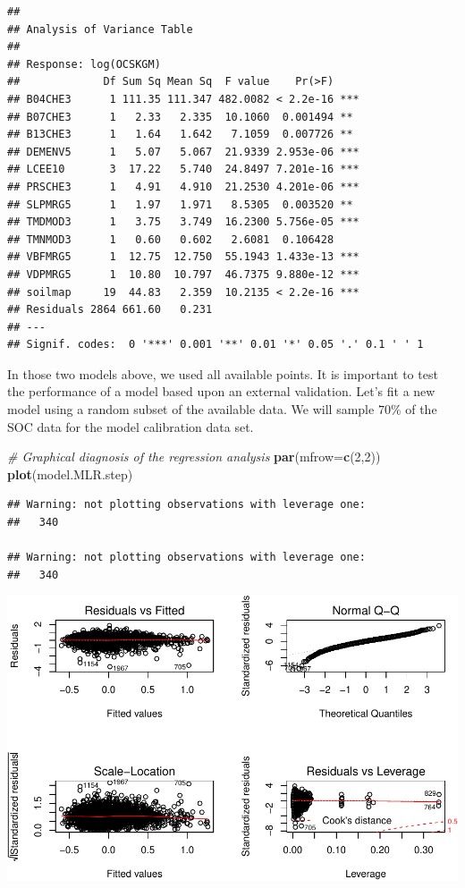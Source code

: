 \documentclass[10pt,b5paper,]{book}
\newenvironment{Shaded}{\begin{snugshade}}{\end{snugshade}}
\newcommand{\CommentTok}[1]{\textcolor[rgb]{0.56,0.35,0.01}{\textit{#1}}}
\newcommand{\DataTypeTok}[1]{\textcolor[rgb]{0.13,0.29,0.53}{#1}}
\newcommand{\DecValTok}[1]{\textcolor[rgb]{0.00,0.00,0.81}{#1}}
\newcommand{\KeywordTok}[1]{\textcolor[rgb]{0.13,0.29,0.53}{\textbf{#1}}}
\newcommand{\NormalTok}[1]{#1}
\theoremstyle{definition}
\theoremstyle{definition}
\theoremstyle{definition}
\theoremstyle{remark}
\begin{document}
\begin{verbatim}
## 
## Analysis of Variance Table
## 
## Response: log(OCSKGM)
##             Df Sum Sq Mean Sq  F value    Pr(>F)    
## B04CHE3      1 111.35 111.347 482.0082 < 2.2e-16 ***
## B07CHE3      1   2.33   2.335  10.1060  0.001494 ** 
## B13CHE3      1   1.64   1.642   7.1059  0.007726 ** 
## DEMENV5      1   5.07   5.067  21.9339 2.953e-06 ***
## LCEE10       3  17.22   5.740  24.8497 7.201e-16 ***
## PRSCHE3      1   4.91   4.910  21.2530 4.201e-06 ***
## SLPMRG5      1   1.97   1.971   8.5305  0.003520 ** 
## TMDMOD3      1   3.75   3.749  16.2300 5.756e-05 ***
## TMNMOD3      1   0.60   0.602   2.6081  0.106428    
## VBFMRG5      1  12.75  12.750  55.1943 1.433e-13 ***
## VDPMRG5      1  10.80  10.797  46.7375 9.880e-12 ***
## soilmap     19  44.83   2.359  10.2135 < 2.2e-16 ***
## Residuals 2864 661.60   0.231                       
## ---
## Signif. codes:  0 '***' 0.001 '**' 0.01 '*' 0.05 '.' 0.1 ' ' 1
\end{verbatim}

In those two models above, we used all available points. It is important
to test the performance of a model based upon an external validation.
Let's fit a new model using a random subset of the available data. We
will sample \(70\%\) of the SOC data for the model calibration data set.

\begin{Shaded}
\begin{Highlighting}[]
\CommentTok{# Graphical diagnosis of the regression analysis}
\KeywordTok{par}\NormalTok{(}\DataTypeTok{mfrow=}\KeywordTok{c}\NormalTok{(}\DecValTok{2}\NormalTok{,}\DecValTok{2}\NormalTok{))}
\KeywordTok{plot}\NormalTok{(model.MLR.step)}
\end{Highlighting}
\end{Shaded}

\begin{verbatim}
## Warning: not plotting observations with leverage one:
##   340

## Warning: not plotting observations with leverage one:
##   340
\end{verbatim}

\includegraphics{SOCMapping_files/figure-latex/unnamed-chunk-45-1.pdf}
\end{document}
